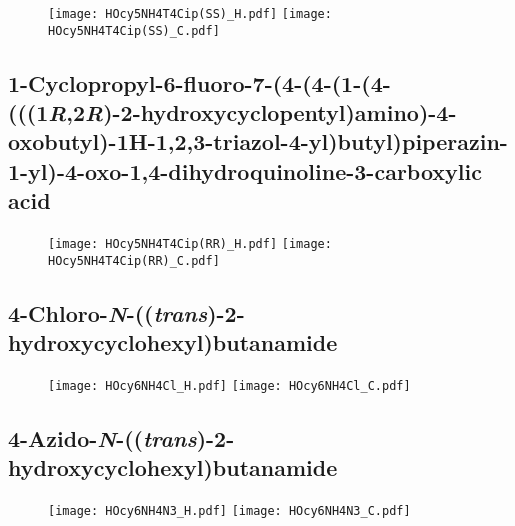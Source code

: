 \begin{figure}[H]
	\centering
		\texttt{[image: HOcy5NH4T4Cip(SS)\_H.pdf]}
		\texttt{[image: HOcy5NH4T4Cip(SS)\_C.pdf]}
\end{figure}

\subsection{1\hyp{}Cyclopropyl\hyp{}6\hyp{}fluoro\hyp{}7\hyp{}(4\hyp{}(4\hyp{}(1\hyp{}(4\hyp{}(((1\textit{R},2\textit{R})\hyp{}2\hyp{}hydroxycyclopentyl)amino)\hyp{}4\hyp{}oxobutyl)\hyp{}1H\hyp{}1,2,3\hyp{}triazol\hyp{}4\hyp{}yl)butyl)piperazin\hyp{}1\hyp{}yl)\hyp{}4\hyp{}oxo\hyp{}1,4\hyp{}dihydroquinoline\hyp{}3\hyp{}carboxylic acid }

\begin{figure}[H]
	\centering
		\texttt{[image: HOcy5NH4T4Cip(RR)\_H.pdf]}
		\texttt{[image: HOcy5NH4T4Cip(RR)\_C.pdf]}
\end{figure}

\subsection{4\hyp{}Chloro\hyp{}\textit{N}\hyp{}((\textit{trans})\hyp{}2\hyp{}hydroxycyclohexyl)butanamide  }

\begin{figure}[H]
	\centering
		\texttt{[image: HOcy6NH4Cl\_H.pdf]}
		\texttt{[image: HOcy6NH4Cl\_C.pdf]}
\end{figure}

\subsection{4\hyp{}Azido\hyp{}\textit{N}\hyp{}((\textit{trans})\hyp{}2\hyp{}hydroxycyclohexyl)butanamide  }

\begin{figure}[H]
	\centering
		\texttt{[image: HOcy6NH4N3\_H.pdf]}
		\texttt{[image: HOcy6NH4N3\_C.pdf]}
\end{figure}

